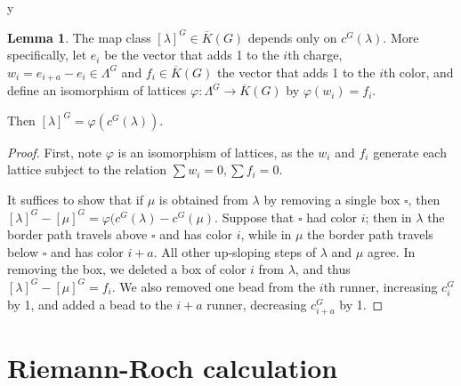 y\documentclass{amsart}[12pt]
\theoremstyle{definition}
\newtheorem{lemma}[dummy]{Lemma}
\begin{document}
\begin{center}
\end{center}



\begin{lemma}
  The map class $[\lambda]^G\in\overline{K}(G)$ depends only on $c^G(\lambda)$.  
More specifically, let $e_i$ be the vector that adds 1 to the $i$th charge, $w_i=e_{i+a}-e_i\in\Lambda^G$ and $f_i\in\overline{K}(G)$ the vector that adds 1 to the $i$th color, and define an isomorphism of lattices $\varphi:\Lambda^G\to\overline{K}(G)$ by $\varphi(w_i)=f_i$.

Then $[\lambda]^G=\varphi(c^G(\lambda))$.
\end{lemma}

\begin{proof}
First, note $\varphi$ is an isomorphism of lattices, as the $w_i$ and $f_i$ generate each lattice subject to the relation $\sum w_i=0, \sum f_i=0$.

It suffices to show that if $\mu$ is obtained from $\lambda$ by removing a single box $\square$, then $[\lambda]^G-[\mu]^G=\varphi(c^G(\lambda)-c^G(\mu)$.  Suppose that $\square$ had color $i$; then in $\lambda$ the border path travels above $\square$ and has color $i$, while in $\mu$ the border path travels below $\square$ and has color $i+a$.  All other up-sloping steps of $\lambda$ and $\mu$ agree.  In removing the box, we deleted a box of color $i$ from $\lambda$, and thus $[\lambda]^G-[\mu]^G=f_i$.  We also removed one bead from the $i$th runner, increasing $c^G_i$ by 1, and added a bead to the $i+a$ runner, decreasing $c^G_{i+a}$ by 1.




\end{proof}



\section{Riemann-Roch calculation}
\end{document}
